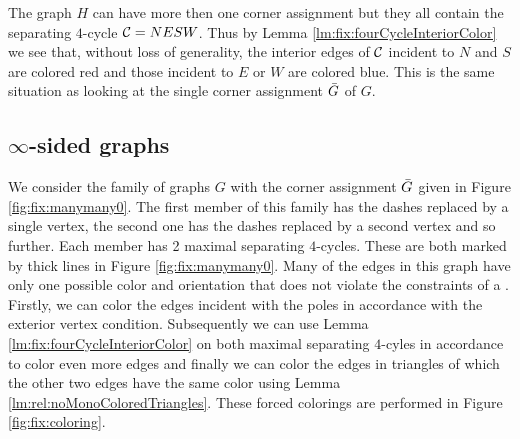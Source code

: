   The graph $H$ can have more then one corner assignment but they all contain the separating $4$-cycle $\mathcal{C}= NESW$. Thus by Lemma \ref{lm:fix:fourCycleInteriorColor} we see that, without loss of generality, the interior edges of $\mathcal{C}$ incident to $N$ and $S$ are colored red and those incident to $E$ or $W$ are colored blue. This is the same situation as looking at the single corner assignment $\bar{G}$ of $G$.


\subsection{$\mathbf{\infty}$-sided graphs}
  \label{ss:fix:manymany}

  We consider the family of graphs $G$ with the corner assignment $\bar{G}$ given in Figure \ref{fig:fix:manymany0}. The first member of this family has the dashes replaced by a single vertex, the second one has the dashes replaced by a second vertex and so further. Each member has 2 maximal separating $4$-cycles. These are both marked by thick lines in Figure \ref{fig:fix:manymany0}.
  Many of the edges in this graph have only one possible color and orientation that does not violate the constraints of a \rel. Firstly, we can color the edges incident with the poles in accordance with the exterior vertex condition. Subsequently we can use Lemma \ref{lm:fix:fourCycleInteriorColor} on both maximal separating $4$-cyles in accordance to color even more edges and finally we can color the edges in triangles of which the other two edges have  the same color using Lemma \ref{lm:rel:noMonoColoredTriangles}. These forced colorings are performed in Figure \ref{fig:fix:coloring}.

